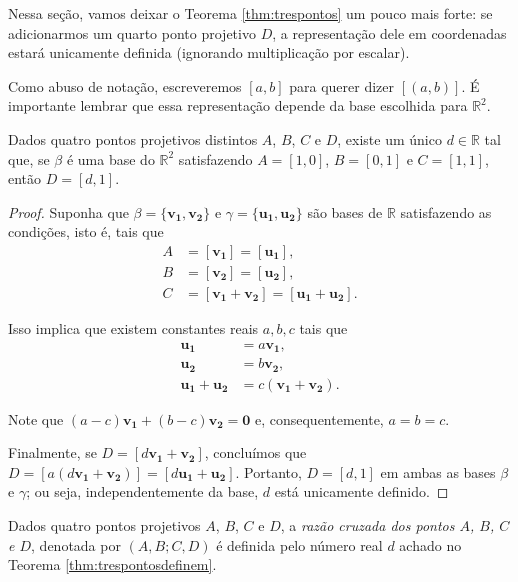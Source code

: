 Nessa seção, vamos deixar o Teorema \ref{thm:trespontos} um pouco mais forte: se adicionarmos um quarto ponto projetivo \(D\), a representação dele em coordenadas estará unicamente definida (ignorando multiplicação por escalar).

Como abuso de notação, escreveremos \([a, b]\) para querer dizer \([(a, b)]\). É importante lembrar que essa representação depende da base escolhida para \(\mathbb{R}^2\).

\begin{thm}\label{thm:trespontosdefinem}
  Dados quatro pontos projetivos distintos \(A\), \(B\), \(C\) e \(D\), existe um único \(d \in \mathbb{R}\) tal que, se \(\beta\) é uma base do \(\mathbb{R}^2\) satisfazendo \(A = [1, 0]\), \(B = [0, 1]\) e \(C = [1, 1]\), então \(D = [d, 1]\).
\end{thm}
\begin{proof}
  Suponha que \(\beta = \{\mathbf{v_1}, \mathbf{v_2}\}\) e \(\gamma = \{\mathbf{u_1}, \mathbf{u_2}\}\) são bases de \(\mathbb{R}\) satisfazendo as condições, isto é, tais que
  \begin{align}
    A &= [\mathbf{v_1}] = [\mathbf{u_1}], \\
    B &= [\mathbf{v_2}] = [\mathbf{u_2}], \\
    C &= [\mathbf{v_1} + \mathbf{v_2}] = [\mathbf{u_1} + \mathbf{u_2}].
  \end{align}

  Isso implica que existem constantes reais \(a, b, c\) tais que
  \begin{align}
    \mathbf{u_1} &= a \mathbf{v_1}, \\
    \mathbf{u_2} &= b \mathbf{v_2}, \\
    \mathbf{u_1} + \mathbf{u_2} &= c \left(\mathbf{v_1} + \mathbf{v_2}\right).
  \end{align}

  Note que \((a - c)\mathbf{v_1} + (b - c)\mathbf{v_2} = \mathbf{0}\) e, consequentemente, \(a = b = c\).

  Finalmente, se \(D = [d\mathbf{v_1} + \mathbf{v_2}]\), concluímos que \(D = [a\left(d\mathbf{v_1} + \mathbf{v_2}\right)] = [d\mathbf{u_1} + \mathbf{u_2}]\). Portanto, \(D = [d, 1]\) em ambas as bases \(\beta\) e \(\gamma\); ou seja, independentemente da base, \(d\) está unicamente definido.
\end{proof}

\begin{defn}\label{defn:razaocruzada}
  Dados quatro pontos projetivos \(A\), \(B\), \(C\) e \(D\), a \emph{razão cruzada dos pontos \(A\), \(B\), \(C\) e \(D\)}, denotada por \((A, B; C, D)\) é definida pelo número real \(d\) achado no Teorema \ref{thm:trespontosdefinem}.
\end{defn}

